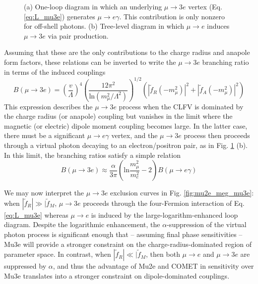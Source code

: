 \documentclass{book}[12pt]
\begin{document}
\begin{figure}
\hfill
{}
\hfill
\caption{(a) One-loop diagram in which an underlying $\mu\rightarrow 3e$ vertex (Eq. \ref{eq:L_mu3e}) generates $\mu\rightarrow e\gamma$. This contribution is only nonzero for off-shell photons. (b) Tree-level diagram in which $\mu\rightarrow e$ induces $\mu\rightarrow 3e$ via pair production.}
\label{fig:mu3e_diagrams}
\end{figure}

Assuming that these are the only contributions to the charge radius and anapole form factors, these relations can be inverted to write the $\mu\rightarrow 3e$ branching ratio in terms of the induced couplings
\begin{equation}
B(\mu\rightarrow 3e)=\left(\frac{v}{\Lambda}\right)^4\left(\frac{12\pi^2}{\mathrm{ln}\left(m_{\mu}^2/\Lambda^2\right)}\right)^{1/2}\left(|\tilde{f}_R(-m_{\mu}^2)|^2+|\tilde{f}_A(-m_{\mu}^2)|^2\right)
\end{equation}
This expression describes the $\mu\rightarrow 3e$ process when the CLFV is dominated by the charge radius (or anapole) coupling but vanishes in the limit where the magnetic (or electric) dipole moment coupling becomes large. In the latter case, there must be a significant $\mu\rightarrow e\gamma$ vertex, and the $\mu\rightarrow 3e$ process then proceeds through a virtual photon decaying to an electron/positron pair, as in Fig. \ref{fig:mu3e_diagrams} (b). In this limit, the branching ratios satisfy a simple relation \cite{PhysRevD.53.2442}
\begin{equation}
B(\mu\rightarrow 3e)\approx \frac{\alpha}{3\pi}\left(\mathrm{ln}\frac{m_{\mu}^2}{m_e^2}-2\right)B(\mu\rightarrow e\gamma)
\end{equation}

We may now interpret the $\mu\rightarrow 3e$ exclusion curves in Fig. \ref{fig:mu2e_meg_mu3e}: when $|\tilde{f}_R|\gg |\tilde{f}_M$, $\mu\rightarrow 3e$ proceeds through the four-Fermion interaction of Eq. \ref{eq:L_mu3e} whereas $\mu\rightarrow e$ is induced by the large-logarithm-enhanced loop diagram. Despite the logarithmic enhancement, the $\alpha$-suppression of the virtual photon process is significant enough that -- assuming final phase sensitivities -- Mu3e will provide a stronger constraint on the charge-radius-dominated region of parameter space. In contrast, when $|\tilde{f}_R|\ll |\tilde{f}_M$, then both $\mu\rightarrow e$ and $\mu\rightarrow 3e$ are suppressed by $\alpha$, and thus the advantage of Mu2e and COMET in sensitivity over Mu3e translates into a stronger constraint on dipole-dominated couplings. 
\end{document}
